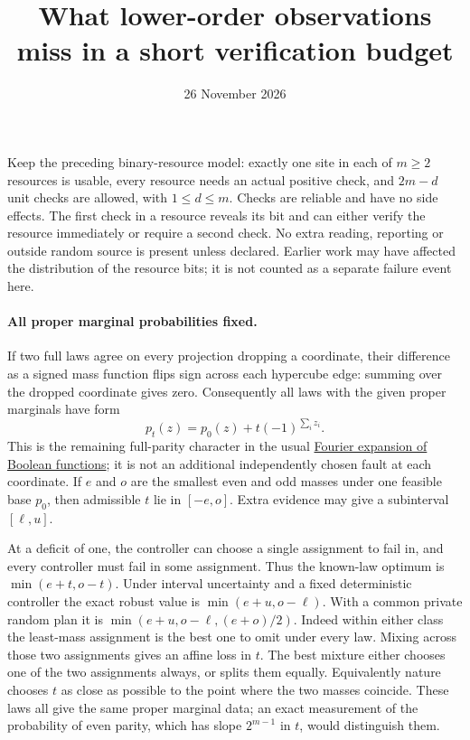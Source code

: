 \documentclass[11pt]{article}
\title{What lower-order observations miss in a short verification budget}
\author{}
\date{26 November 2026}
\begin{document}
\maketitle

Keep the preceding binary-resource model: exactly one site in each of $m\ge2$ resources is usable, every resource needs an actual positive check, and $2m-d$ unit checks are allowed, with $1\le d\le m$. Checks are reliable and have no side effects. The first check in a resource reveals its bit and can either verify the resource immediately or require a second check. No extra reading, reporting or outside random source is present unless declared. Earlier work may have affected the distribution of the resource bits; it is not counted as a separate failure event here.

\paragraph{All proper marginal probabilities fixed.}
If two full laws agree on every projection dropping a coordinate, their difference as a signed mass function flips sign across each hypercube edge: summing over the dropped coordinate gives zero. Consequently all laws with the given proper marginals have form
\[
 p_t(z)=p_0(z)+t(-1)^{\sum_i z_i}.
\]
This is the remaining full-parity character in the usual \href{https://arxiv.org/abs/2105.10386}{Fourier expansion of Boolean functions}; it is not an additional independently chosen fault at each coordinate. If $e$ and $o$ are the smallest even and odd masses under one feasible base $p_0$, then admissible $t$ lie in $[-e,o]$. Extra evidence may give a subinterval $[\ell,u]$.

At a deficit of one, the controller can choose a single assignment to fail in, and every controller must fail in some assignment. Thus the known-law optimum is $\min(e+t,o-t)$. Under interval uncertainty and a fixed deterministic controller the exact robust value is $\min(e+u,o-\ell)$. With a common private random plan it is $\min(e+u,o-\ell,(e+o)/2)$. Indeed within either class the least-mass assignment is the best one to omit under every law. Mixing across those two assignments gives an affine loss in $t$. The best mixture either chooses one of the two assignments always, or splits them equally. Equivalently nature chooses $t$ as close as possible to the point where the two masses coincide. These laws all give the same proper marginal data; an exact measurement of the probability of even parity, which has slope $2^{m-1}$ in $t$, would distinguish them.
\end{document}
